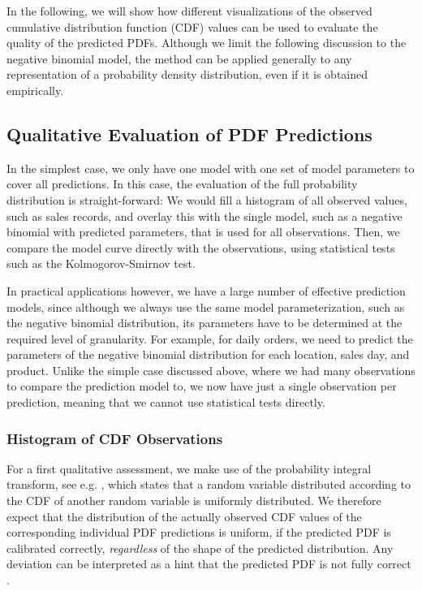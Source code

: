 \documentclass[BCOR=1mm, DIV=calc,10pt,
twoside=true,
twocolumn,
headings=normal]{scrartcl}
\begin{document}
In the following, we will show how different visualizations of the observed cumulative distribution function (CDF) values can be used to evaluate the quality of the predicted PDFs. Although we limit the following discussion to the negative binomial model, the method can be applied generally to any representation of a probability density distribution, even if it is obtained empirically.

\subsection{Qualitative Evaluation of PDF Predictions}

In the simplest case, we only have one model with one set of model parameters to cover all predictions. In this case, the evaluation of the full probability distribution is straight-forward: We would fill a histogram of all observed values, such as sales records, and overlay this with the single model, such as a negative binomial with predicted parameters, that is used for all observations. Then, we compare the model curve directly with the observations, using statistical tests such as the Kolmogorov-Smirnov test.

In practical applications however, we have a large number of effective prediction models, since although we always use the same model parameterization, such as the negative binomial distribution, its parameters have to be determined at the required level of granularity. For example, for daily orders, we need to predict the parameters of the negative binomial distribution for each location, sales day, and product. Unlike the simple case discussed above, where we had many observations to compare the prediction model to, we now have just a single observation per prediction, meaning that we cannot use statistical tests directly.

\subsubsection{Histogram of CDF Observations}
\label{sec:cdf_histo}

For a first qualitative assessment, we make use of the probability integral transform, see e.g. \cite{Angus1994,casella2002statistical}, which states that a random variable distributed according to the CDF of another random variable is uniformly distributed. We therefore expect that the distribution of the actually observed CDF values of the corresponding individual PDF predictions is uniform, if the predicted PDF is calibrated correctly, {\em regardless} of the shape of the predicted distribution. Any deviation can be interpreted as a hint that the predicted PDF is not fully correct \cite{diebold1998vevaluating}.
\end{document}

